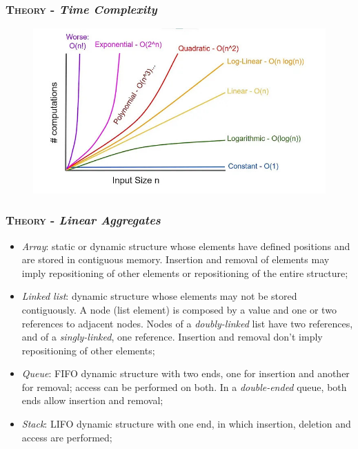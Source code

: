 \documentclass[10pt]{article}
\begin{document}
\begin{multicols*}{5}
{\subsubsection*{\textsc{Theory} - \emph{Time Complexity}} 
\begin{figure}[H]
\begin{center}
\includegraphics[scale=.21]{complexity.jpg}	
\end{center}
\end{figure}

\subsubsection*{\textsc{Theory} - \emph{Linear Aggregates}} 

\begin{itemize}[leftmargin=*,topsep=0.25pt]
  \setlength\itemsep{-1.8pt}
	\item \emph{Array}: static or dynamic structure whose elements have defined positions and are stored in contiguous memory. Insertion and removal of elements may imply repositioning of other elements or repositioning of the entire structure; 
	\item \emph{Linked list}: dynamic structure whose elements may not be stored contiguously. A node (list element) is composed by a value and one or two references to adjacent nodes. Nodes of a \emph{doubly-linked} list have two references, and of a \emph{singly-linked}, one reference. Insertion and removal don't imply repositioning of other elements;
	\item \emph{Queue}: FIFO dynamic structure with two ends, one for insertion and another for removal; access can be performed on both. In a \emph{double-ended} queue, both ends allow insertion and removal;  
	\item \emph{Stack}: LIFO dynamic structure with one end, in which insertion, deletion and access are performed;
\end{itemize}

}
\end{multicols*}
\end{document}
